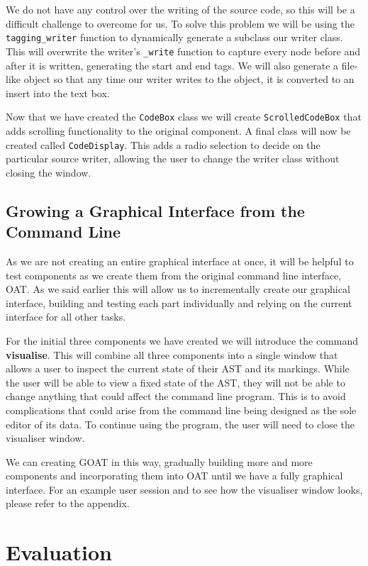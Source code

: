 \documentclass[twoside,a4paper]{report}
\begin{document}
We do not have any control over the writing of the source code, so this will be a difficult challenge to overcome for us. To solve this problem we will be
using the \texttt{tagging\_writer} function to dynamically generate a subclass our writer class. This will overwrite the writer's \texttt{\_write} function
to capture every node before and after it is written, generating the start and end tags. We will also generate a file-like object so that any time our writer
writes to the object, it is converted to an insert into the text box.

Now that we have created the \texttt{CodeBox} class we will create \texttt{ScrolledCodeBox} that adds scrolling functionality to the original component.
A final class will now be created called \texttt{CodeDisplay}. This adds a radio selection to decide on the particular source writer, allowing the user
to change the writer class without closing the window.

\subsection{Growing a Graphical Interface from the Command Line}

As we are not creating an entire graphical interface at once, it will be helpful to test components as we create them from the original command
line interface, OAT. As we said earlier this will allow us to incrementally create our graphical interface, building and testing each part individually
and relying on the current interface for all other tasks.

For the initial three components we have created we will introduce the command \textbf{visualise}. This will combine all three components into a single
window that allows a user to inspect the current state of their AST and its markings. While the user will be able to view a fixed state of the AST, they
will not be able to change anything that could affect the command line program. This is to avoid complications that could arise from the command line
being designed as the sole editor of its data. To continue using the program, the user will need to close the visualiser window.

We can creating GOAT in this way, gradually building more and more components and incorporating them into OAT until we have a fully graphical interface.
For an example user session and to see how the visualiser window looks, please refer to the appendix.

\section{Evaluation}
\end{document}
